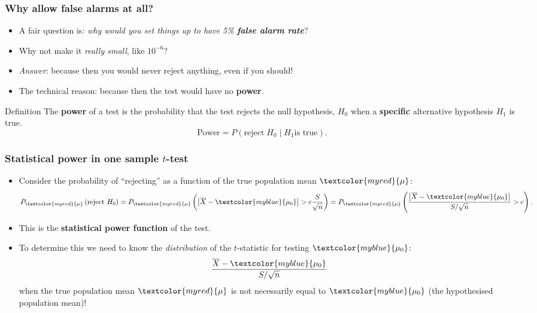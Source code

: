 \documentclass[a4paper]{article}
\begin{document}
\subsubsection{Why allow false alarms at all?}
\begin{itemize}
	\item A fair question is: \textit{why would you set things up to have 5\% \textbf{false alarm rate}}?
	\item Why not make it \textit{really small}, like \( 10^{-6} \)?
	\item \textit{Answer}: because then you would never reject anything, even if you should!
	\item The technical reason: because then the test would have no \textbf{power}.
\end{itemize}
\begin{bluebox}{Definition}
	The \textbf{power} of a test is the probability that the test rejects the null hypothesis, \( H_0 \) when a \textbf{specific} alternative hypothesis \( H_1 \) is true.
	\[
		\text{Power} = P(\text{reject}\; H_0 \mid H_1 \text{is true}).
	\]
\end{bluebox}
\subsubsection{Statistical power in one sample \( t \)-test}
\begin{itemize}
	\item Consider the probability of ``rejecting'' as a function of the true population mean \( \textcolor{myred}{\mu} \):
	\[
			P_{\textcolor{myred}{\mu}} \left(\text{reject }H_0\right) = P_{\textcolor{myred}{\mu}} \left( \left| \overline{X} -\textcolor{myblue}{\mu_0} \right| >c\frac{S}{\sqrt{n}} \right)=
			P_{\textcolor{myred}{\mu}} \left( \frac{\left| \overline{X} -\textcolor{myblue}{\mu_0}\right|}{S/\sqrt{n}}>c \right).
	\]
	\item This is the \textbf{statistical power function} of the test.
	\item To determine this we need to know the \textit{distribution} of the \( t \)-statistic for testing \( \textcolor{myblue}{\mu_0} \):
	\[
		\frac{\overline{X}- {\textcolor{myblue}{\mu_0}}}{S/\sqrt{n}}
	\]
	when the true population mean \( \textcolor{myred}{\mu} \) is not necessarily equal to \( \textcolor{myblue}{\mu_0} \) (the hypothesised population mean)!
\end{itemize}
\end{document}
